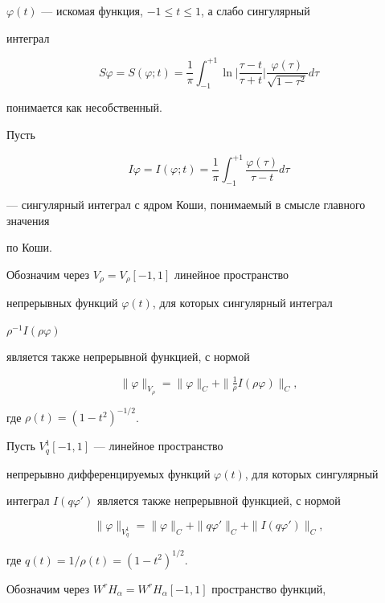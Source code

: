 $\varphi(t)$ --- искомая функция, $-1\leq t\leq 1$, а слабо сингулярный


интеграл


$$


S \varphi =S( \varphi;t) = \frac{1}{\pi}


\int^{+1}_{-1}\ln\bigg|\frac{\tau-t}{\tau+t}\bigg|


\frac{\varphi(\tau)}{\sqrt{1-\tau^2}}d\tau


$$


понимается как несобственный.





Пусть


$$


I\varphi=I(\varphi;t)=\frac{1}{\pi}


\int^{+1}_{-1}\frac{\varphi(\tau)}{\tau-t}d\tau


$$


--- сингулярный интеграл с ядром Коши, понимаемый в смысле главного значения


по Коши.


Обозначим через $V_{\rho} = V_{\rho}[-1,1]$ линейное пространство


непрерывных функций $\varphi(t)$, для которых сингулярный интеграл


$\rho^{-1}I(\rho\varphi)$


является также непрерывной функцией, с нормой


$$


\|\varphi\|_{V_\rho} =


\|\varphi\|_C +\|\tfrac{1}{\rho}I(\rho\varphi)\|_C,


$$


где $\rho(t) = (1-t^2)^{-1/2}$.


Пусть $V_{q}^{1}[-1,1]$ --- линейное пространство


непрерывно дифференцируемых функций $\varphi(t)$, для которых сингулярный


интеграл $I(q\varphi')$ является также непрерывной функцией, с нормой


$$


\|\varphi\|_{V_q^1} = \|\varphi\|_C +


\|q\varphi'\|_C + \|I(q\varphi')\|_C,


$$


где $q(t) = 1/\rho(t) = (1-t^2)^{1/2}$.


Обозначим через $W^rH_{\alpha}=W^rH_{\alpha}[-1,1] $ пространство функций,


